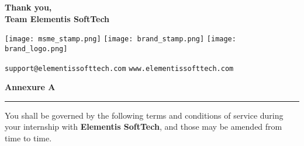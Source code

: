 \documentclass[a4paper,12pt]{article}
\begin{document}
\vspace{0.5cm}
\noindent
\textbf{Thank you,} \\
\textbf{Team Elementis SoftTech} \\

\vspace{1cm}

\begin{center}
    \texttt{[image: msme\_stamp.png]}
    \hfill
    \texttt{[image: brand\_stamp.png]}
    \hfill
    \texttt{[image: brand\_logo.png]}
\end{center}

\vspace{0.5cm}
\noindent
\texttt{support@elementissofttech.com} \hfill \texttt{www.elementissofttech.com}

\newpage
\begin{center}
    \vspace{0.5cm}
    {\LARGE \textbf{Annexure A}} \\[0.5cm]
    \rule{\textwidth}{1pt}
\end{center}

\noindent
You shall be governed by the following terms and conditions of service during your internship with \textbf{Elementis SoftTech}, and those may be amended from time to time.
\end{document}
